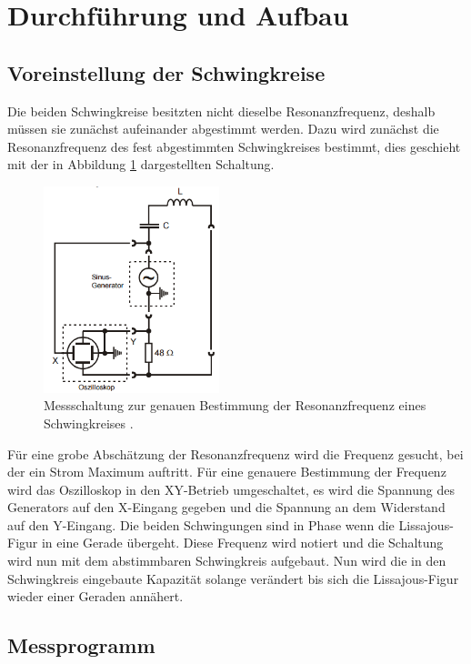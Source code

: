 \section{Durchführung und Aufbau}
\label{sec:Durchführung}

\subsection{Voreinstellung der Schwingkreise}
Die beiden Schwingkreise besitzten nicht dieselbe Resonanzfrequenz, deshalb müssen sie zunächst aufeinander abgestimmt werden. Dazu wird zunächst die Resonanzfrequenz des fest abgestimmten Schwingkreises bestimmt, dies geschieht mit der in Abbildung \ref{fig:ResFrequenz} dargestellten Schaltung.

\begin{figure}[H]
  \centering
  \includegraphics[height=6cm]{picture/BestimmungDerResFrequenz.PNG}
  \caption{Messschaltung zur genauen Bestimmung der Resonanzfrequenz eines Schwingkreises \cite{sample}.}
  \label{fig:ResFrequenz}
\end{figure}

Für eine grobe Abschätzung der Resonanzfrequenz wird die Frequenz gesucht, bei der ein Strom Maximum auftritt. Für eine genauere Bestimmung der Frequenz wird das Oszilloskop in den XY-Betrieb umgeschaltet, es wird die Spannung des Generators auf den X-Eingang gegeben und die Spannung an dem Widerstand auf den Y-Eingang. Die beiden Schwingungen sind in Phase wenn die Lissajous-Figur in eine Gerade übergeht. Diese Frequenz wird notiert und die Schaltung wird nun mit dem abstimmbaren Schwingkreis aufgebaut. Nun wird die in den Schwingkreis eingebaute Kapazität solange verändert bis sich die Lissajous-Figur wieder einer Geraden annähert.

\subsection{Messprogramm}

